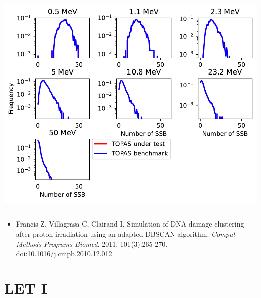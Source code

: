 \documentclass[aspectratio=1610]{beamer}
\begin{document}
\begin{frame}{\secname}
\begin{columns}
\begin{column}{0.6\linewidth}
   \includegraphics[width=\textwidth]{./DBSCAN/DBSCAN1_g4em-dna_opt6}
  \end{column}
 \end{columns}
\begin{itemize}
\item \tiny{Francis Z, Villagrasa C, Clairand I. Simulation of DNA damage clustering after proton irradiation using an adapted DBSCAN algorithm. \textit{Comput Methods Programs Biomed}. 2011; 101(3):265-270. doi:10.1016/j.cmpb.2010.12.012}
\end{itemize}
\end{frame}

\section{LET I}
\end{document}
